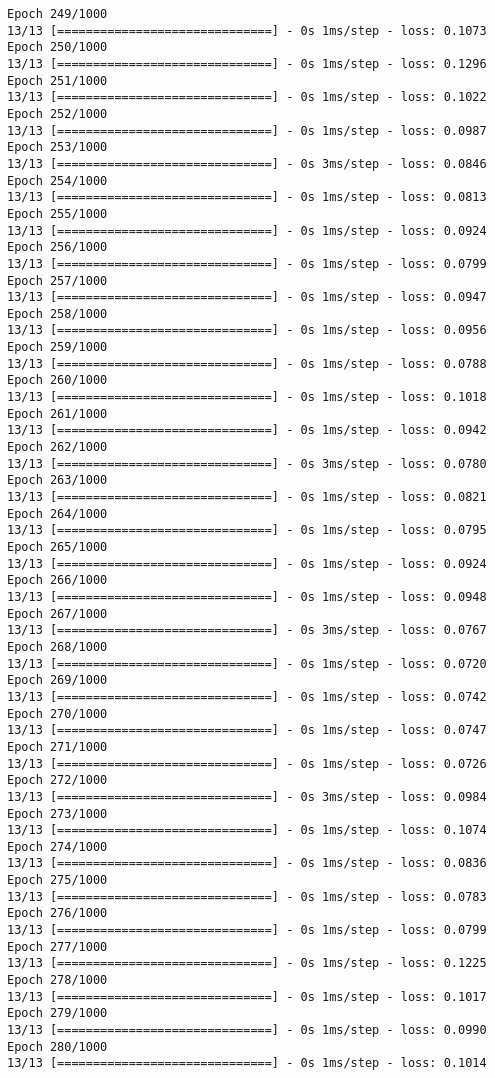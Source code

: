 \documentclass[11pt]{article}
\begin{document}
\begin{Verbatim}[commandchars=\\\{\}]
Epoch 249/1000
13/13 [==============================] - 0s 1ms/step - loss: 0.1073
Epoch 250/1000
13/13 [==============================] - 0s 1ms/step - loss: 0.1296
Epoch 251/1000
13/13 [==============================] - 0s 1ms/step - loss: 0.1022
Epoch 252/1000
13/13 [==============================] - 0s 1ms/step - loss: 0.0987
Epoch 253/1000
13/13 [==============================] - 0s 3ms/step - loss: 0.0846
Epoch 254/1000
13/13 [==============================] - 0s 1ms/step - loss: 0.0813
Epoch 255/1000
13/13 [==============================] - 0s 1ms/step - loss: 0.0924
Epoch 256/1000
13/13 [==============================] - 0s 1ms/step - loss: 0.0799
Epoch 257/1000
13/13 [==============================] - 0s 1ms/step - loss: 0.0947
Epoch 258/1000
13/13 [==============================] - 0s 1ms/step - loss: 0.0956
Epoch 259/1000
13/13 [==============================] - 0s 1ms/step - loss: 0.0788
Epoch 260/1000
13/13 [==============================] - 0s 1ms/step - loss: 0.1018
Epoch 261/1000
13/13 [==============================] - 0s 1ms/step - loss: 0.0942
Epoch 262/1000
13/13 [==============================] - 0s 3ms/step - loss: 0.0780
Epoch 263/1000
13/13 [==============================] - 0s 1ms/step - loss: 0.0821
Epoch 264/1000
13/13 [==============================] - 0s 1ms/step - loss: 0.0795
Epoch 265/1000
13/13 [==============================] - 0s 1ms/step - loss: 0.0924
Epoch 266/1000
13/13 [==============================] - 0s 1ms/step - loss: 0.0948
Epoch 267/1000
13/13 [==============================] - 0s 3ms/step - loss: 0.0767
Epoch 268/1000
13/13 [==============================] - 0s 1ms/step - loss: 0.0720
Epoch 269/1000
13/13 [==============================] - 0s 1ms/step - loss: 0.0742
Epoch 270/1000
13/13 [==============================] - 0s 1ms/step - loss: 0.0747
Epoch 271/1000
13/13 [==============================] - 0s 1ms/step - loss: 0.0726
Epoch 272/1000
13/13 [==============================] - 0s 3ms/step - loss: 0.0984
Epoch 273/1000
13/13 [==============================] - 0s 1ms/step - loss: 0.1074
Epoch 274/1000
13/13 [==============================] - 0s 1ms/step - loss: 0.0836
Epoch 275/1000
13/13 [==============================] - 0s 1ms/step - loss: 0.0783
Epoch 276/1000
13/13 [==============================] - 0s 1ms/step - loss: 0.0799
Epoch 277/1000
13/13 [==============================] - 0s 1ms/step - loss: 0.1225
Epoch 278/1000
13/13 [==============================] - 0s 1ms/step - loss: 0.1017
Epoch 279/1000
13/13 [==============================] - 0s 1ms/step - loss: 0.0990
Epoch 280/1000
13/13 [==============================] - 0s 1ms/step - loss: 0.1014

\end{Verbatim}
\end{document}
